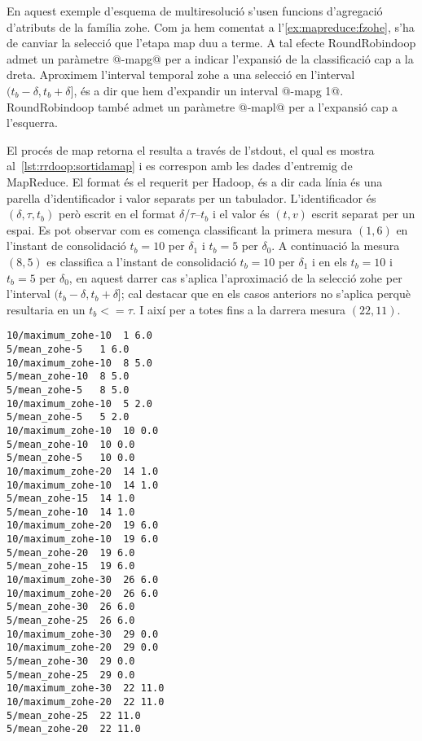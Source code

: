 En aquest exemple d'esquema de multiresolució s'usen funcions
d'agregació d'atributs de la família \gls{zohe}. Com ja hem comentat a
l'\autoref{ex:mapreduce:fzohe}, s'ha de canviar la selecció que
l'etapa map duu a terme. A tal efecte RoundRobindoop admet un
paràmetre @-mapg@ per a indicar l'expansió de la classificació cap a
la dreta. Aproximem l'interval temporal \gls{zohe} a una selecció en
l'interval $(t_b-\delta,t_b+\delta]$, és a dir que hem d'expandir un
interval @-mapg 1@.  RoundRobindoop també admet un paràmetre @-mapl@
per a l'expansió cap a l'esquerra.


El procés de map retorna el resulta a través de l'stdout, el qual es
mostra al~\autoref{lst:rrdoop:sortidamap} i es correspon amb les dades
d'entremig de MapReduce. El format és el requerit per Hadoop, és a dir
cada línia és una parella d'identificador i valor separats per un
tabulador. L'identificador és $(\delta,\tau,t_b)$ però escrit en el
format $\delta$/$\tau$--$t_b$ i el valor és $(t,v)$ escrit separat per
un espai. Es pot observar com es comença classificant la primera
mesura $(1,6)$ en l'instant de consolidació $t_b=10$ per $\delta_1$ i
$t_b=5$ per $\delta_0$.  A continuació la mesura $(8,5)$ es classifica
a l'instant de consolidació $t_b=10$ per $\delta_1$ i en els $t_b=10$
i $t_b=5$ per $\delta_0$, en aquest darrer cas s'aplica l'aproximació
de la selecció \gls{zohe} per l'interval $(t_b-\delta,t_b+\delta]$;
cal destacar que en els casos anteriors no s'aplica perquè resultaria en
un $t_b<= \tau$.  I així per a totes fins a la darrera mesura
$(22,11)$.
\begin{lstlisting}[style=stdout,caption=Sortida del procés map,label=lst:rrdoop:sortidamap]
10/maximum_zohe-10	1 6.0
5/mean_zohe-5	1 6.0
10/maximum_zohe-10	8 5.0
5/mean_zohe-10	8 5.0
5/mean_zohe-5	8 5.0
10/maximum_zohe-10	5 2.0
5/mean_zohe-5	5 2.0
10/maximum_zohe-10	10 0.0
5/mean_zohe-10	10 0.0
5/mean_zohe-5	10 0.0
10/maximum_zohe-20	14 1.0
10/maximum_zohe-10	14 1.0
5/mean_zohe-15	14 1.0
5/mean_zohe-10	14 1.0
10/maximum_zohe-20	19 6.0
10/maximum_zohe-10	19 6.0
5/mean_zohe-20	19 6.0
5/mean_zohe-15	19 6.0
10/maximum_zohe-30	26 6.0
10/maximum_zohe-20	26 6.0
5/mean_zohe-30	26 6.0
5/mean_zohe-25	26 6.0
10/maximum_zohe-30	29 0.0
10/maximum_zohe-20	29 0.0
5/mean_zohe-30	29 0.0
5/mean_zohe-25	29 0.0
10/maximum_zohe-30	22 11.0
10/maximum_zohe-20	22 11.0
5/mean_zohe-25	22 11.0
5/mean_zohe-20	22 11.0
\end{lstlisting}


